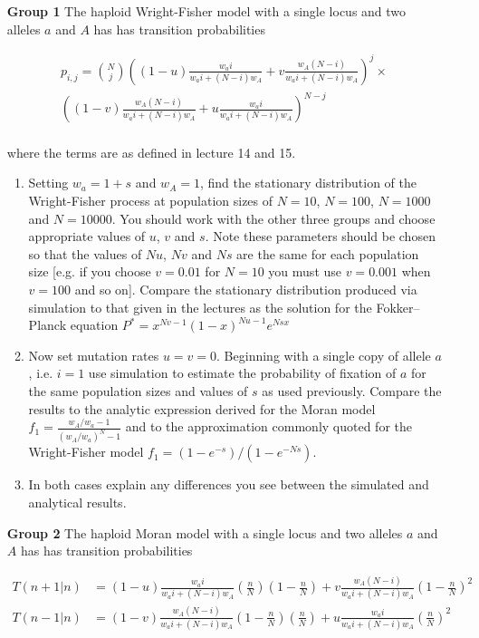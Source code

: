 \documentclass[12pt]{article}
\begin{document}
\begin{enumerate}
\item[\bf Group 1]  The haploid Wright-Fisher model with a single locus and two alleles $a$ and $A$ has has transition probabilities

\begin{eqnarray*}
p_{i,j}={N \choose j}\left((1-u) \frac{w_a i}{w_a i+(N-i)w_A}+v\frac{w_A (N-i)}{w_a i+(N-i)w_A}\right)^j\times\\
\left((1-v) \frac{w_A(N- i)}{w_a i+(N-i)w_A}+u\frac{w_a i}{w_a i+(N-i)w_A}\right)^{N-j}
\end{eqnarray*}
\\ 
where the terms are as defined in lecture 14 and 15.

\begin{enumerate}
\item Setting $w_a=1+s$ and $w_A=1$, find the stationary distribution of the Wright-Fisher process at population sizes of $N=10$, $N=100$, $N=1000$ and $N=10000$. You should work with the other three groups and choose appropriate values of $u$, $v$ and $s$. Note these parameters should be chosen so that the values of $Nu$, $Nv$ and $Ns$ are the same for each population size [e.g. if you choose $v=0.01$ for $N=10$ you must use $v=0.001$ when $v=100$ and so on]. Compare the stationary distribution produced via simulation to that given in the lectures as the solution for the Fokker--Planck equation $P^*=x^{Nv-1}(1-x)^{Nu-1}e^{Nsx}$

\item Now set mutation rates $u=v=0$. Beginning with a single copy of allele $a$, i.e. $i=1$ use simulation to estimate the probability of fixation of $a$ for the same population sizes and values of $s$ as used previously. Compare the results to the analytic expression derived for the Moran model $f_1=\frac{w_A/w_a-1}{(w_A/w_a)^N-1}$ and to the approximation commonly quoted for the Wright-Fisher model $f_1=(1-e^{-s})/(1-e^{-Ns})$. 

\item In both cases explain any differences you see between the simulated and analytical results.

\end{enumerate}

\item[\bf Group 2] 
The haploid Moran model with a single locus and two alleles $a$ and $A$ has has transition probabilities

\begin{eqnarray*}
T(n+1|n)&=(1-u)\frac{w_a i}{w_a i+(N-i)w_A}\left(\frac{n}{N}\right)\left(1-\frac{n}{N}\right)+v\frac{w_A (N-i)}{w_a i+(N-i)w_A}\left(1-\frac{n}{N}\right)^2\\
T(n-1|n)&=(1-v)\frac{w_A (N-i)}{w_a i+(N-i)w_A}\left(1-\frac{n}{N}\right)\left(\frac{n}{N}\right)+u\frac{w_a i}{w_a i+(N-i)w_A}\left(\frac{n}{N}\right)^2\\
\end{eqnarray*}
\\


\end{enumerate}
\end{document}

